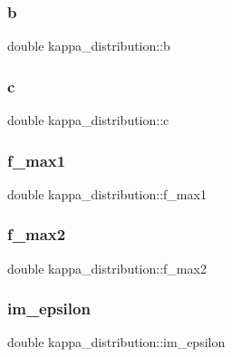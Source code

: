 \subsubsection{\texorpdfstring{b}{b}}
{\footnotesize\ttfamily double kappa\+\_\+distribution\+::b}

\hypertarget{classkappa__distribution_a90698395f61fde53725916a1405c2613}{}\label{classkappa__distribution_a90698395f61fde53725916a1405c2613} 
\subsubsection{\texorpdfstring{c}{c}}
{\footnotesize\ttfamily double kappa\+\_\+distribution\+::c}

\hypertarget{classkappa__distribution_a4c5660bf0eb745115a97b763c400a2e7}{}\label{classkappa__distribution_a4c5660bf0eb745115a97b763c400a2e7} 
\subsubsection{\texorpdfstring{f\+\_\+max1}{f\_max1}}
{\footnotesize\ttfamily double kappa\+\_\+distribution\+::f\+\_\+max1}

\hypertarget{classkappa__distribution_a197a28c1e2fb49e3ab2ba12fbf0b9de3}{}\label{classkappa__distribution_a197a28c1e2fb49e3ab2ba12fbf0b9de3} 
\subsubsection{\texorpdfstring{f\+\_\+max2}{f\_max2}}
{\footnotesize\ttfamily double kappa\+\_\+distribution\+::f\+\_\+max2}

\hypertarget{classkappa__distribution_a6506e5322c9a9c919af36d9d34dbb180}{}\label{classkappa__distribution_a6506e5322c9a9c919af36d9d34dbb180} 
\subsubsection{\texorpdfstring{im\+\_\+epsilon}{im\_epsilon}}
{\footnotesize\ttfamily double kappa\+\_\+distribution\+::im\+\_\+epsilon}

